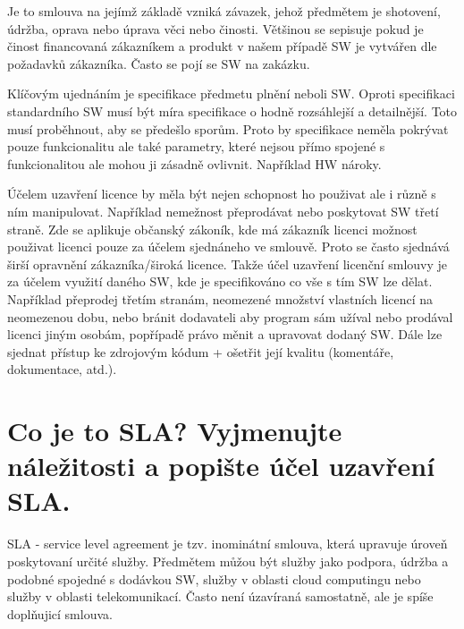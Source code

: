 \documentclass[12pt,a4paper,czech]{article}
\newcommand{\nadpis}[1]{{\section{#1}}}
\begin{document}
Je to smlouva na jejímž základě vzniká závazek, jehož předmětem je shotovení, údržba, oprava nebo úprava věci nebo činosti. Většinou se sepisuje pokud je činost financovaná zákazníkem a produkt v našem případě SW je vytvářen dle požadavků zákazníka. Často se pojí se SW na zakázku.

Klíčovým ujednáním je specifikace předmetu plnění neboli SW. Oproti specifikaci standardního SW musí být míra specifikace o hodně rozsáhlejší a detailnější. Toto musí proběhnout, aby se předešlo sporům. Proto by specifikace neměla pokrývat pouze funkcionalitu ale také parametry, které nejsou přímo spojené s funkcionalitou ale mohou ji zásadně ovlivnit. Například HW nároky.

Účelem uzavření licence by měla být nejen schopnost ho použivat ale i různě s ním manipulovat. Například nemežnost přeprodávat nebo poskytovat SW třetí straně. Zde se aplikuje občanský zákoník, kde má zákazník licenci možnost použivat licenci pouze za účelem sjednáneho ve smlouvě. Proto se často sjednává širší opravnění zákazníka/široká licence. Takže účel uzavření licenční smlouvy je za účelem využití daného SW, kde je specifikováno co vše s tím SW lze dělat. Například přeprodej třetím stranám, neomezené množství vlastních licencí na neomezenou dobu, nebo bránit dodavateli aby program sám užíval nebo prodával licenci jiným osobám, popřípadě právo měnit a upravovat dodaný SW. Dále lze sjednat přístup ke zdrojovým kódum + ošetřit její kvalitu (komentáře, dokumentace, atd.).


\newpage
\nadpis{Co je to SLA? Vyjmenujte náležitosti a popište účel uzavření SLA.}

SLA - service level agreement je tzv. inominátní smlouva, která upravuje úroveň poskytovaní určité služby. Předmětem můžou být služby jako podpora, údržba a podobné spojedné s dodávkou SW, služby v oblasti cloud computingu nebo služby v oblasti telekomunikací. Často není úzavíraná samostatně, ale je spíše doplňujicí smlouva.
\end{document}
